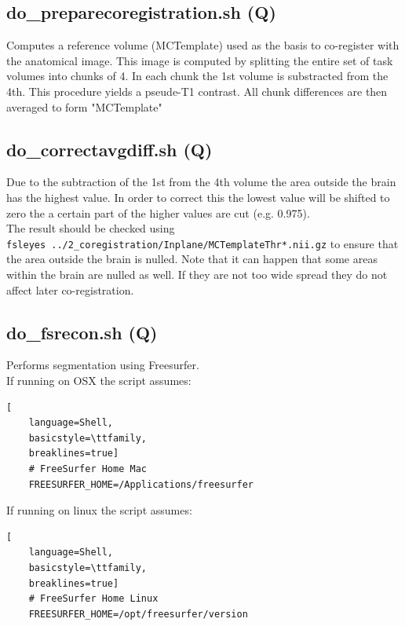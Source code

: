 \documentclass[12pt,a4paper]{scrartcl}
\begin{document}
\subsection{do\_preparecoregistration.sh (Q)}
\label{sec:prepcoreg}
Computes a reference volume (MCTemplate) used as the basis  to co-register with the anatomical image. This image is computed by splitting the entire set of task volumes into chunks of 4. In each chunk the 1st volume is substracted from the 4th. This procedure yields a pseude-T1 contrast. All chunk differences are then averaged to form "MCTemplate"

\subsection{do\_correctavgdiff.sh (Q)}
\label{sec:corravg}
Due to the subtraction of the 1st from the 4th volume the area outside the brain has the highest value. In order to correct this the lowest value will be shifted to zero the a certain part of the higher values are cut (e.g. 0.975).\\

\noindent The result should be checked using\\
\texttt{fsleyes ../2\_coregistration/Inplane/MCTemplateThr*.nii.gz} to ensure that the area outside the brain is nulled. Note that it can happen that some areas within the brain are nulled as well. If they are not too wide spread they do not affect later co-registration.

\subsection{do\_fsrecon.sh (Q)}
\label{sec:fsrecon}
Performs segmentation using Freesurfer.\\

\noindent If running on OSX the script assumes:
\begin{lstlisting}[
    language=Shell,
    basicstyle=\ttfamily,
    breaklines=true]
    # FreeSurfer Home Mac
    FREESURFER_HOME=/Applications/freesurfer
\end{lstlisting}

\noindent If running on linux the script assumes:\\
\begin{lstlisting}[
    language=Shell,
    basicstyle=\ttfamily,
    breaklines=true]
    # FreeSurfer Home Linux
    FREESURFER_HOME=/opt/freesurfer/version
\end{lstlisting}
\end{document}
